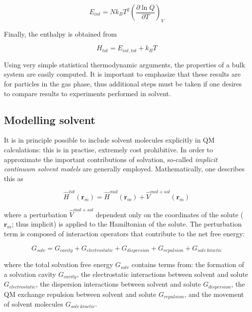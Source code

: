 \begin{equation}
  E_{int} = Nk_B T^2\left( \frac{\partial \ln Q}{\partial T} \right)_V
\end{equation}

\noindent Finally, the enthalpy is obtained from

\begin{equation}
  H_{tot} = E_{int,tot} + k_B T
\end{equation}

Using very simple statistical thermodynamic arguments, the properties of a bulk
system are easily computed. It is important to emphasize that these results are
for particles in the gas phase, thus additional steps must be taken if one
desires to compare results to experiments performed in solvent.

\subsection{Modelling solvent}

It is in principle possible to include solvent molecules explicitly in QM
calculations: this is in practise, extremely cost prohibitive. In order to
approximate the important contributions of solvation, so-called \emph{implicit
continuum solvent models} are generally employed.\cite{Mennucci2007,Cramer2004}
Mathematically, one describes this as

\begin{equation}
  \hat{H}^{tot}(\mathbf{r}_m) = \hat{H}^{mol}(\mathbf{r}_m) + \hat{V}^{mol+sol}(\mathbf{r}_m)
\end{equation}

\noindent where a perturbation $\hat{V}^{mol+sol}$ dependent only on the
coordinates of the solute ($\mathbf{r}_m$; thus implicit) is applied to the
Hamiltonian of the solute. The perturbation term is composed of interaction
operators that contribute to the net free energy:

\begin{equation}
G_{solv} = G_{cavity} + G_{electrostatic} + G_{dispersion} + G_{repulsion} +
G_{solv~kinetic}
\end{equation}

\noindent where the total solvation free energy $G_{solv}$ contains terms from:
the formation of a solvation cavity $G_{cavity}$, the electrostatic
interactions between solvent and solute $G_{electrostatic}$, the dispersion
interactions between solvent and solute $G_{dispersion}$, the QM exchange
repulsion between solvent and solute $G_{repulsion}$, and the movement of
solvent molecules $G_{solv~kinetic}$.

